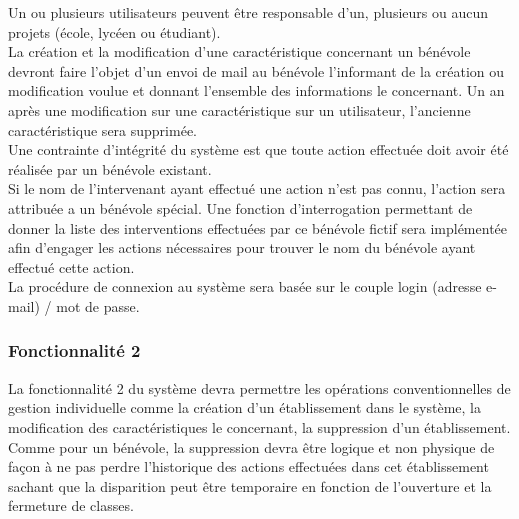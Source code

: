 Un ou plusieurs utilisateurs peuvent être responsable d'un, plusieurs ou aucun projets (école, lycéen ou étudiant).\\

La création et la modification d'une caractéristique concernant un bénévole devront faire l'objet d'un envoi de mail au bénévole l'informant de la création ou modification voulue et donnant l'ensemble des informations le concernant. Un an après une modification sur une caractéristique sur un utilisateur, l'ancienne caractéristique sera supprimée. \\


Une contrainte d'intégrité du système est que toute action effectuée doit avoir été réalisée par un bénévole existant. \\
Si le nom de l'intervenant ayant effectué une action n'est pas connu, l'action sera attribuée a un bénévole spécial. Une fonction d'interrogation permettant de donner la liste des interventions effectuées par ce bénévole fictif sera implémentée afin d'engager les actions nécessaires pour trouver le nom du bénévole ayant effectué cette action. \\


La procédure de connexion au système sera basée sur le couple login (adresse e-mail) / mot de passe.
\\



\subsubsection{Fonctionnalité 2}
La fonctionnalité 2 du système devra permettre les opérations conventionnelles de gestion individuelle comme la création d'un établissement dans le système, la modification des
caractéristiques le concernant, la suppression d'un établissement. Comme pour un bénévole, la suppression devra être logique et non physique de façon à ne pas perdre l'historique des actions effectuées dans cet établissement sachant que la disparition peut être temporaire en fonction de l'ouverture et la fermeture de classes. \\


